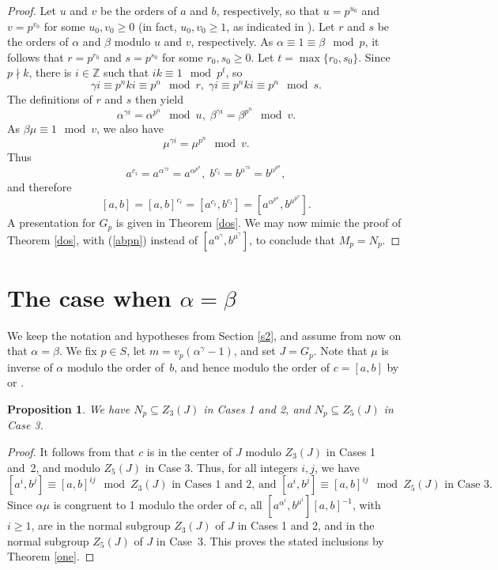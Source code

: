 \documentclass{amsart}
\newtheorem{prop}[theorem]{Proposition}
\theoremstyle{definition}
\theoremstyle{remark}
\newcommand \Z{{\mathbb Z}}
\begin{document}
\begin{proof} Let $u$ and $v$ be the orders of $a$ and $b$, respectively, so that
$u=p^{u_0}$ and $v=p^{v_0}$ for some $u_0,v_0\geq 0$ (in fact, $u_0,v_0\geq 1$, as indicated in
\cite[pp. 602-603]{M}). Let $r$ and $s$ be the orders of $\alpha$ and $\beta$ modulo $u$ and $v$,
respectively. As $\alpha\equiv 1\equiv \beta\mod p$, it follows that $r=p^{r_0}$ and $s=p^{s_0}$
for some $r_0,s_0\geq 0$. Let $t=\max\{r_0,s_0\}$. Since $p\nmid k$, there is $i\in\Z$ such that
$ik\equiv 1\mod p^t$, so
$$
\gamma i\equiv p^n k i\equiv p^n\mod r,\; \gamma i\equiv p^n k i\equiv p^n\mod s.
$$
The definitions of $r$ and $s$ then yield
$$
\alpha^{\gamma i}=\alpha^{p^n}\mod u,\; \beta^{\gamma i}=\beta^{p^n}\mod v.
$$
As $\beta\mu\equiv 1\mod v$, we also have
$$
\mu^{\gamma i}=\mu^{p^n}\mod v.
$$
Thus
$$
a^{c_i}=a^{\alpha^{\gamma i}}=a^{\alpha^{p^n}},\; b^{c_i}=b^{\mu^{\gamma i}}=b^{\mu^{p^n}},
$$
and therefore
\begin{equation}\label{abpn}
[a,b]=[a,b]^{c_i}=[a^{c_i},b^{c_i}]=[a^{\alpha^{p^n}},b^{\mu^{p^n}}].
\end{equation}
A presentation for $G_p$ is given in Theorem \ref{dos}. We may now mimic the proof of Theorem \ref{dos},
with (\ref{abpn}) instead of $[a^{\alpha^{\gamma}},b^{\mu^{\gamma}}]$, to conclude that $M_p=N_p$.
\end{proof}

\section{The case when $\alpha=\beta$}\label{s3}

We keep the notation and hypotheses from Section \ref{s2}, and assume from now on that $\alpha=\beta$.
We fix $p\in S$, let $m=v_p(\alpha^\gamma-1)$, and
set $J=G_p$. Note that $\mu$ is inverse of $\alpha$ modulo the order of~$b$, and hence modulo
the order of $c=[a,b]$ by \cite[pp. 609]{M} or \cite[Proposition 7.2]{MS}. 


\begin{prop}\label{adentro} We have $N_p\subseteq Z_3(J)$ in Cases 1 and 2, 
and $N_p\subseteq Z_5(J)$ in Case 3.
\end{prop}

\begin{proof} It follows from \cite[Theorem 8.1 and Proposition 8.2]{MS} that $c$ is in the center of $J$ modulo $Z_3(J)$
in Cases 1 and~2, and modulo $Z_5(J)$ in Case 3. Thus, for all integers $i,j$, we have
$$
[a^i,b^j]\equiv [a,b]^{ij}\mod Z_3(J)\text{ in Cases 1 and 2, and } [a^i,b^j]\equiv [a,b]^{ij}\mod Z_5(J)\text{ in Case 3}.
$$
Since $\alpha\mu$ is congruent to 1 modulo the order of $c$, all $[a^{\alpha^i},b^{\mu^i}][a,b]^{-1}$, with $i\geq 1$, are in 
the normal subgroup $Z_3(J)$ of $J$ in Cases 1 and 2, and in the normal subgroup $Z_5(J)$ of $J$ in Case~3. This proves
the stated inclusions by Theorem \ref{one}. %
\end{proof}
\end{document}
